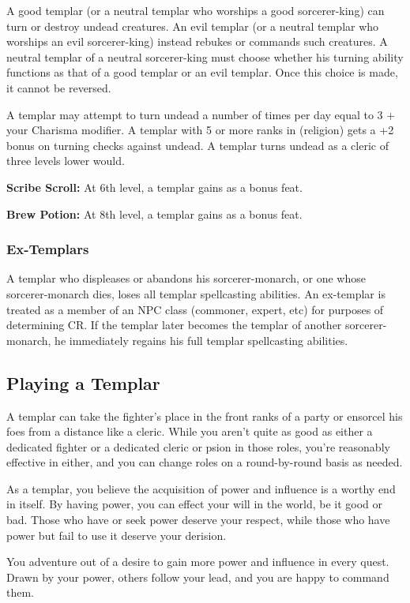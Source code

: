 A good templar (or a neutral templar who worships a good sorcerer-king) can turn or destroy undead creatures. An evil templar (or a neutral templar who worships an evil sorcerer-king) instead rebukes or commands such creatures. A neutral templar of a neutral sorcerer-king must choose whether his turning ability functions as that of a good templar or an evil templar. Once this choice is made, it cannot be reversed.

A templar may attempt to turn undead a number of times per day equal to 3 + your Charisma modifier. A templar with 5 or more ranks in  (religion) gets a +2 bonus on turning checks against undead. A templar turns undead as a cleric of three levels lower would.

\textbf{Scribe Scroll:} At 6th level, a templar gains  as a bonus feat.

\textbf{Brew Potion:} At 8th level, a templar gains  as a bonus feat.

\subsubsection{Ex-Templars}
A templar who displeases or abandons his sorcerer-monarch, or one whose sorcerer-monarch dies, loses all templar spellcasting abilities. An ex-templar is treated as a member of an NPC class (commoner, expert, etc) for purposes of determining CR. If the templar later becomes the templar of another sorcerer-monarch, he immediately regains his full templar spellcasting abilities.

\subsection{Playing a Templar}

A templar can take the fighter's place in the front ranks of a party or ensorcel his foes from a distance like a cleric. While you aren't quite as good as either a dedicated fighter or a dedicated cleric or psion in those roles, you're reasonably effective in either, and you can change roles on a round-by-round basis as needed.

As a templar, you believe the acquisition of power and influence is a worthy end in itself. By having power, you can effect your will in the world, be it good or bad. Those who have or seek power deserve your respect, while those who have power but fail to use it deserve your derision.

You adventure out of a desire to gain more power and influence in every quest. Drawn by your power, others follow your lead, and you are happy to command them.

